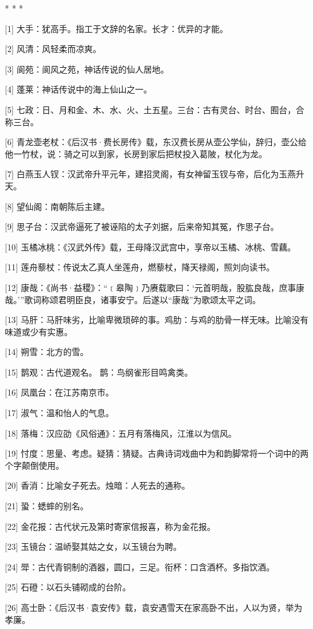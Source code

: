 \documentclass[12pt,UTF8]{ctexbook}
\begin{document}
* * *



[1] 大手：犹高手。指工于文辞的名家。长才：优异的才能。

[2] 风清：风轻柔而凉爽。

[3] 阆苑：阆风之苑，神话传说的仙人居地。

[4] 蓬莱：神话传说中的海上仙山之一。

[5] 七政：日、月和金、木、水、火、土五星。三台：古有灵台、时台、囿台，合称三台。

[6] 青龙壶老杖：《后汉书·费长房传》载，东汉费长房从壶公学仙，辞归，壶公给他一竹杖，说：骑之可以到家，长房到家后把杖投入葛陂，杖化为龙。

[7] 白燕玉人钗：汉武帝升平元年，建招灵阁，有女神留玉钗与帝，后化为玉燕升天。

[8] 望仙阁：南朝陈后主建。

[9] 思子台：汉武帝逼死了被诬陷的太子刘据，后来帝知其冤，作思子台。

[10] 玉橘冰桃：《汉武外传》载，王母降汉武宫中，享帝以玉橘、冰桃、雪藕。

[11] 莲舟藜杖：传说太乙真人坐莲舟，燃藜杖，降天禄阁，照刘向读书。

[12] 康哉：《尚书·益稷》：“﹝皋陶﹞乃赓载歌曰：‘元首明哉，股肱良哉，庶事康哉。’”歌词称颂君明臣良，诸事安宁。后遂以“康哉”为歌颂太平之词。

[13] 马肝：马肝味劣，比喻卑微琐碎的事。鸡肋：与鸡的肋骨一样无味。比喻没有味道或少有实惠。

[14] 朔雪：北方的雪。

[15] 鹊观：古代道观名。 鹊：鸟纲雀形目鸣禽类。

[16] 凤凰台：在江苏南京市。

[17] 淑气：温和怡人的气息。

[18] 落梅：汉应劭《风俗通》：五月有落梅风，江淮以为信风。

[19] 忖度：思量、考虑。疑猜：猜疑。古典诗词戏曲中为和韵脚常将一个词中的两个字颠倒使用。

[20] 香消：比喻女子死去。烛暗：人死去的通称。

[21] 蛩：蟋蟀的别名。

[22] 金花报：古代状元及第时寄家信报喜，称为金花报。

[23] 玉镜台：温峤娶其姑之女，以玉镜台为聘。

[24] 斝：古代青铜制的酒器，圆口，三足。衔杯：口含酒杯。多指饮酒。

[25] 石磴：以石头铺砌成的台阶。

[26] 高士卧：《后汉书·袁安传》载，袁安遇雪天在家高卧不出，人以为贤，举为孝廉。
\end{document}
